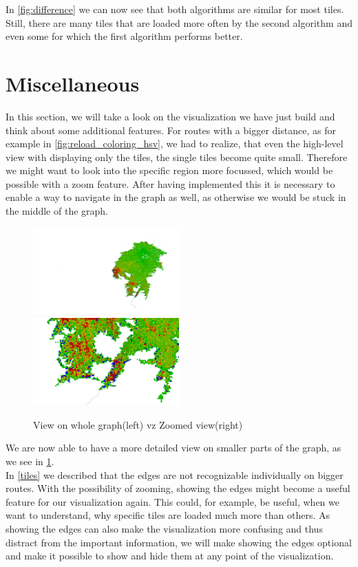 \documentclass
[
	paper = a4,
    pagesize,
	12 pt,
	oneside,                       %
    open = right,
	DIV = calc,
	BCOR = 0 mm,                   %
	bibtotoc
]
{scrbook}
\begin{document}
In  \cref{fig:difference} we can now see that both algorithms are similar for most tiles.
Still, there are many tiles that are loaded more often by the second algorithm and even some for which the first algorithm performs better.


\section{Miscellaneous}

In this section, we will take a look on the visualization we have just build and think about some additional features.
For routes with a bigger distance, as for example in \cref{fig:reload_coloring_hsv}, we had to realize, that even the high-level view with displaying only the tiles, the single tiles become quite small.
Therefore we might want to look into the specific region more focussed, which would be possible with a zoom feature.
After having implemented this it is necessary to enable a way to navigate in the graph as well, as otherwise we would be stuck in the middle of the graph.

\begin{figure}[H]
    \includegraphics[width=0.5\textwidth]{Images/vis-zoom-small.png}
    \includegraphics[width=0.5\textwidth]{Images/vis-zoom-large.png}
\caption[]{View on whole graph(left) vz Zoomed view(right)}
\label{fig:zoom}
\end{figure}

We are now able to have a more detailed view on smaller parts of the graph, as we see in \cref{fig:zoom}.\\
In \cref{tiles} we described that the edges are not recognizable individually on bigger routes.
With the possibility of zooming, showing the edges might become a useful feature for our visualization again.
This could, for example, be useful, when we want to understand, why specific tiles are loaded much more than others.
As showing the edges can also make the visualization more confusing and thus distract from the important information, we will make showing the edges optional and make it possible to show and hide them at any point of the visualization.
\end{document}
